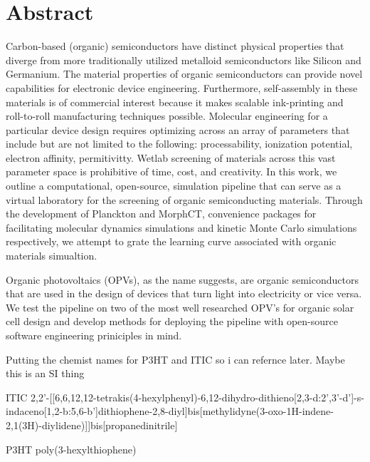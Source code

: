 
\chapter*{Abstract}

Carbon-based (organic) semiconductors have distinct physical properties that diverge from more traditionally
utilized metalloid semiconductors like Silicon and Germanium.
The material properties of organic semiconductors can provide novel capabilities
for electronic device engineering. Furthermore, 
self-assembly in these materials is of commercial interest because it makes scalable ink-printing and
roll-to-roll manufacturing techniques possible.
Molecular engineering for a particular device design
requires optimizing across an array of parameters that include but are
not limited to the following: processability, ionization potential, electron affinity, permitivitty. 
Wetlab screening of materials across
this vast parameter space is prohibitive of time, cost, and creativity. 
In this work, we outline a computational, open-source, simulation pipeline that can serve as a 
virtual laboratory for the screening of organic semiconducting materials. 
Through the development of Planckton and MorphCT, convenience packages for facilitating molecular dynamics
simulations and kinetic Monte Carlo simulations respectively, we attempt to grate the learning curve
associated with organic materials simualtion. 

Organic photovoltaics (OPVs), as the name suggests, are organic semiconductors that are used in the design of
devices that turn light into electricity or vice versa.  
We test the pipeline on
two of the most well researched OPV's for organic solar cell design and develop methods for deploying
the pipeline with open-source software engineering priniciples in mind.


Putting the chemist names for P3HT and ITIC so i can refernce later. Maybe this is an SI thing

ITIC
2,2'-[[6,6,12,12-tetrakis(4-hexylphenyl)-6,12-dihydro-dithieno[2,3-d:2',3'-d']-s-indaceno[1,2-b:5,6-b']dithiophene-2,8-diyl]bis[methylidyne(3-oxo-1H-indene-2,1(3H)-diylidene)]]bis[propanedinitrile]

P3HT poly(3-hexylthiophene)




